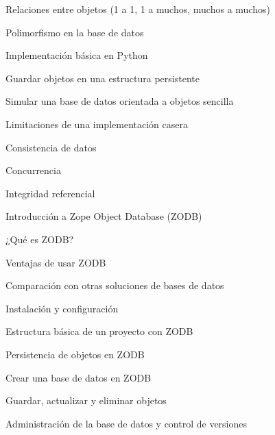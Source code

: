 \begin{longenum}
\begin{longenum}
\begin{longenum}
\begin{longenum}
                \item Relaciones entre objetos (1 a 1, 1 a muchos, muchos a muchos)
                \item Polimorfismo en la base de datos
            \end{longenum}
            \item Implementación básica en Python
            \begin{longenum}
                \item Guardar objetos en una estructura persistente
                \item Simular una base de datos orientada a objetos sencilla
            \end{longenum}
            \item Limitaciones de una implementación casera
            \begin{longenum}
                \item Consistencia de datos
                \item Concurrencia
                \item Integridad referencial
            \end{longenum}
        \end{longenum}
        \item Introducción a Zope Object Database (ZODB)
        \begin{longenum}
            \item ¿Qué es ZODB?
            \begin{longenum}
                \item Ventajas de usar ZODB
                \item Comparación con otras soluciones de bases de datos
            \end{longenum}
            \item Instalación y configuración
            \begin{longenum}
                \item Estructura básica de un proyecto con ZODB
            \end{longenum}
            \item Persistencia de objetos en ZODB
            \begin{longenum}
                \item Crear una base de datos en ZODB
                \item Guardar, actualizar y eliminar objetos
                \item Administración de la base de datos y control de versiones

\end{longenum}
\end{longenum}
\end{longenum}
\end{longenum}
